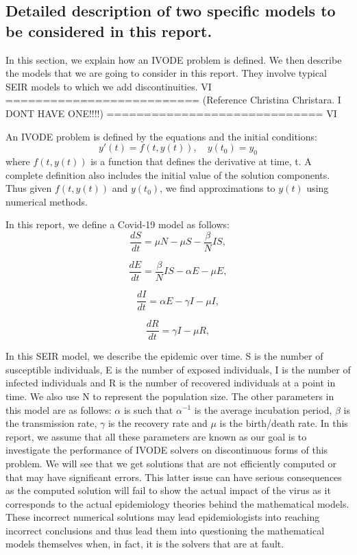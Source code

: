 \subsection{Detailed description of two specific models to be considered in this report.} 
\label{subsection:SEIR_model}
In this section, we explain how an IVODE problem is defined. We then describe the models that we are going to consider in this report. They involve typical SEIR models to which we add discontinuities.
VI ==========================
(Reference Christina Christara. I DONT HAVE ONE!!!!) 
============================= VI

An IVODE problem is defined by the equations and the initial conditions:
\begin{equation}
y'(t) = f(t, y(t)), \quad y(t_0) = y_0 \nonumber
\end{equation}
where $f(t, y(t))$ is a function that defines the derivative at time, t. A complete definition also includes the initial value of the solution components. Thus given $f(t, y(t))$ and $y(t_0)$, we find approximations to  $y(t)$ using numerical methods. 

In this report, we define a Covid-19 model as follows:
\begin{equation}
\frac{\textit{d}S}{\textit{dt}} = \mu N - \mu S - \frac{\beta}{N}IS, \nonumber
\end{equation}

\begin{equation}
\frac{\textit{d}E}{\textit{dt}} = \frac{\beta}{N}IS - \alpha E - \mu E, \nonumber
\end{equation}

\begin{equation}
\frac{\textit{d}I}{\textit{dt}} = \alpha E - \gamma I - \mu I, \nonumber
\end{equation}

\begin{equation}
\frac{\textit{d}R}{\textit{dt}} = \gamma I - \mu R, \nonumber
\end{equation} 

In this SEIR model, we describe the epidemic over time. S is the number of susceptible individuals, E is the number of exposed individuals, I is the number of infected individuals and R is the number of recovered individuals at a point in time. We also use N to represent the population size.
The other parameters in this model are as follows: $\alpha$ is such that $\alpha^{-1}$ is the average incubation period, $\beta$ is the transmission rate, $\gamma$ is the recovery rate and $\mu$ is the birth/death rate. In this report, we assume that all these parameters are known as our goal is to investigate the performance of IVODE solvers on discontinuous forms of this problem. We will see that we get solutions that are not efficiently computed or that may have significant errors. This latter issue can have serious consequences as the computed solution will fail to show the actual impact of the virus as it corresponds to the actual epidemiology theories behind the mathematical models. These incorrect numerical solutions may lead epidemiologists into reaching incorrect conclusions and thus lead them into questioning the mathematical models themselves when, in fact, it is the solvers that are at fault.

